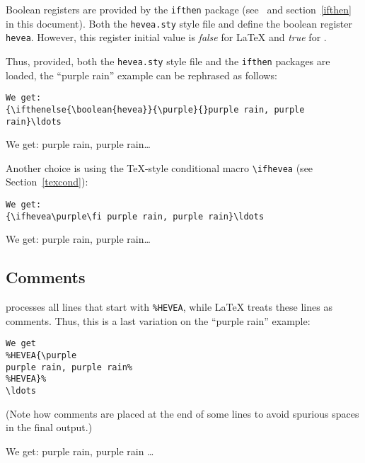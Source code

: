 Boolean registers are provided by the \texttt{ifthen} package
(see~\cite[Section~C.8.5]{latex} and section~\ref{ifthen} in this
document).
Both the \texttt{hevea.sty} style file
and \hevea{} define the boolean register \texttt{hevea}.
However, this register initial value is \textit{false} for \LaTeX{}
and \textit{true} for \hevea{}.



Thus, provided, both the \texttt{hevea.sty} style file and the
\texttt{ifthen} packages are loaded, the ``purple rain'' example can
be rephrased as follows:
\begin{verbatim}
We get:
{\ifthenelse{\boolean{hevea}}{\purple}{}purple rain, purple rain}\ldots
\end{verbatim}
We get:
{purple rain, purple rain}\ldots

\medskip


Another choice is using the \TeX{}-style conditional macro
\verb+\ifhevea+ (see Section~\ref{texcond}):
\begin{verbatim}
We get:
{\ifhevea\purple\fi purple rain, purple rain}\ldots
\end{verbatim}
We get: {\ifhevea\purple\fi purple rain, purple rain}\ldots

\subsection{Comments}\label{comments}
\hevea{} processes all lines that start with \verb+%HEVEA+, while
\LaTeX{} treats these lines as comments.
Thus, this is a last variation on  the ``purple rain'' example:
\begin{verbatim}
We get
%HEVEA{\purple
purple rain, purple rain%
%HEVEA}%
\ldots
\end{verbatim}
(Note how comments are placed at the end of some lines to avoid spurious spaces
in the final output.)

We get:
purple rain, purple rain%
\ldots


